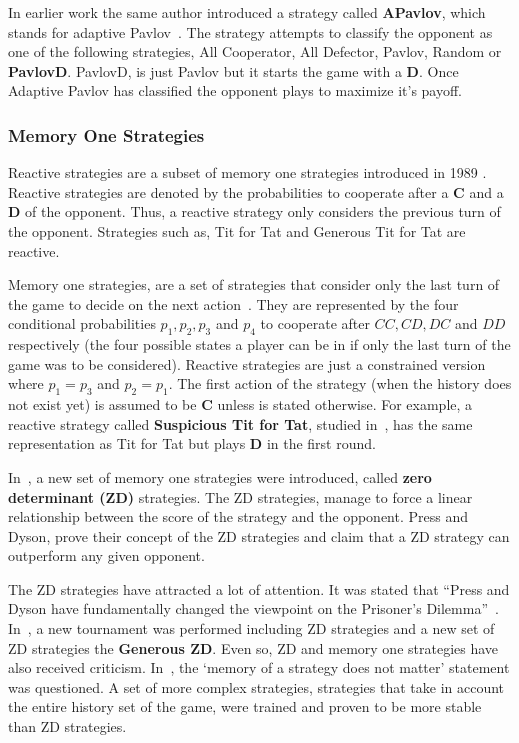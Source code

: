\documentclass{article}
\begin{document}
In earlier work the same author introduced a strategy called \textbf{APavlov},
which stands for adaptive Pavlov~\cite{Li2007}. The strategy attempts to 
classify the opponent as one of the following strategies, All Cooperator, 
All Defector, Pavlov, Random or \textbf{PavlovD}. PavlovD, is just Pavlov
but it starts the game with a \textbf{D}. Once Adaptive Pavlov has classified
the opponent plays to maximize it's payoff.

\subsubsection{Memory One Strategies}

Reactive strategies are a subset of memory one strategies introduced in 1989
\cite{nowak1989}. Reactive strategies are denoted by the probabilities to cooperate
after a \textbf{C} and a \textbf{D} of the opponent. Thus, a reactive strategy
only considers the previous turn of the opponent. Strategies such as, Tit for
Tat and Generous Tit for Tat are reactive.

Memory one strategies, are a set of strategies that consider only the last turn
of the game to decide on the next action~\cite{Nowak1990}. They are represented
by the four conditional probabilities \(p_1, p_2, p_3\) and
\(p_4\) to cooperate after \(CC, CD, DC\) and \(DD\) respectively
(the four possible states a player can be in if only the last turn of the game was
to be considered). Reactive strategies are just a constrained version where
\(p_1=p_3\) and \(p_2=p_1\). The first action of the strategy (when the history
does not exist yet) is assumed to be \textbf{C} unless is stated otherwise. For
example, a reactive strategy called \textbf{Suspicious Tit for Tat}, studied
in~\cite{Nowak1992}, has the same representation as Tit for Tat but plays
\textbf{D} in the first round.

In~\cite{Press2012}, a new set of memory one strategies were introduced, called
\textbf{zero determinant (ZD)} strategies. The ZD strategies,
manage to force a linear relationship between the score of the strategy
and the opponent. Press and Dyson, prove their concept of the ZD strategies
and claim that a ZD strategy can outperform any given opponent.

The ZD strategies have attracted a lot of attention. It was stated that
``Press and Dyson have fundamentally changed the viewpoint on the Prisoner’s
Dilemma''~\cite{Stewart2012}. In~\cite{Stewart2012}, a new tournament was
performed including ZD strategies and a new set of ZD 
strategies the \textbf{Generous ZD}. Even so, ZD and memory one strategies have
also received criticism. In~\cite{Lee2015}, the `memory of a strategy does
not matter' statement was questioned. A set of more complex strategies,
strategies that take in account the entire history set of the game, were
trained and proven to be more stable than ZD strategies.
\end{document}
